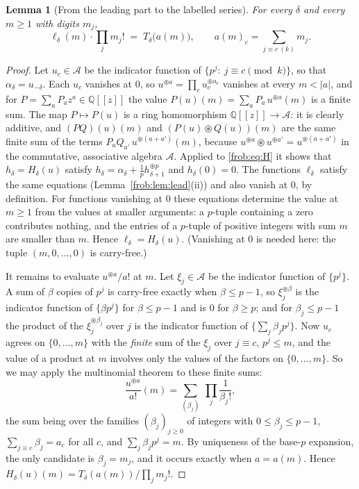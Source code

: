 \documentclass[11pt]{article}
\newtheorem{lemma}[theorem]{Lemma}
\theoremstyle{definition}
\theoremstyle{remark}
\numberwithin{equation}{section}
\numberwithin{figure}{section}
\newcommand{\Q}{\mathbb Q}
\newcommand{\A}{\mathcal A}
\newcommand{\cf}{\circledast}
\begin{document}
\begin{lemma}[From the leading part to the labelled series]\label{frob:lem:subst}
For every $\delta$ and every $m\ge1$ with digits $m_j$,
\[
 \ell_\delta(m)\cdot\prod_jm_j!\;=\;T_\delta\bigl(a(m)\bigr),\qquad
 a(m)_c=\sum_{j\equiv c\ (k)}m_j .
\]
\end{lemma}

\begin{proof}
Let $u_c\in\A$ be the indicator function of $\{p^j:\ j\equiv c\pmod k\}$, so that
$\alpha_\delta=u_{-\delta}$. Each $u_c$ vanishes at $0$, so $u^{\cf a}=\prod_cu_c^{\cf a_c}$
vanishes at every $m<|a|$, and for $P=\sum_aP_az^a\in\Q[[z]]$ the value
$P(u)(m)=\sum_aP_a\,u^{\cf a}(m)$ is a finite sum. The map $P\mapsto P(u)$ is a ring
homomorphism $\Q[[z]]\to\A$: it is clearly additive, and $(PQ)(u)(m)$ and
$(P(u)\cf Q(u))(m)$ are the same finite sum of the terms
$P_aQ_{a'}\,u^{\cf(a+a')}(m)$, because $u^{\cf a}\cf u^{\cf a'}=u^{\cf(a+a')}$ in the
commutative, associative algebra $\A$. Applied to \eqref{frob:eq:H} it shows that
$h_\delta=H_\delta(u)$ satisfy $h_\delta=\alpha_\delta+\frac1p h_{\delta+1}^{\cf p}$ and
$h_\delta(0)=0$. The functions $\ell_\delta$ satisfy the same equations
(Lemma~\ref{frob:lem:lead}(ii)) and also vanish at $0$, by definition. For functions vanishing at
$0$ these equations determine the value at $m\ge1$ from the values at smaller arguments: a
$p$-tuple containing a zero contributes nothing, and the entries of a $p$-tuple of positive
integers with sum $m$ are smaller than $m$. Hence $\ell_\delta=H_\delta(u)$. (Vanishing at
$0$ is needed here: the tuple $(m,0,\dots,0)$ is carry-free.)

It remains to evaluate $u^{\cf a}/a!$ at $m$. Let $\xi_j\in\A$ be the indicator function of
$\{p^j\}$. A sum of $\beta$ copies of $p^j$ is carry-free exactly when $\beta\le p-1$, so
$\xi_j^{\cf\beta}$ is the indicator function of $\{\beta p^j\}$ for $\beta\le p-1$ and is $0$
for $\beta\ge p$; and for $\beta_j\le p-1$ the product of the $\xi_j^{\cf\beta_j}$ over $j$
is the indicator function of $\{\sum_j\beta_jp^j\}$. Now $u_c$ agrees on $\{0,\dots,m\}$
with the \emph{finite} sum of the $\xi_j$ over $j\equiv c$, $p^j\le m$, and the value of a
product at $m$ involves only the values of the factors on $\{0,\dots,m\}$. So we may apply
the multinomial theorem to these finite sums:
\[
 \frac{u^{\cf a}}{a!}(m)=\sum_{(\beta_j)}\ \prod_j\frac1{\beta_j!},
\]
the sum being over the families $(\beta_j)_{j\ge0}$ of integers with $0\le\beta_j\le p-1$,
$\sum_{j\equiv c}\beta_j=a_c$ for all $c$, and $\sum_j\beta_jp^j=m$. By uniqueness of the
base-$p$ expansion, the only candidate is $\beta_j=m_j$, and it occurs exactly when
$a=a(m)$. Hence $H_\delta(u)(m)=T_\delta(a(m))/\prod_jm_j!$.
\end{proof}
\end{document}
